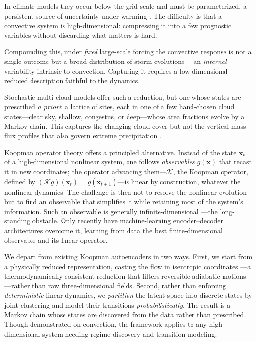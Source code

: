 \documentclass[
    aps,
    prl,
    reprint,
    superscriptaddress,
    amsmath,amssymb,
    floatfix,
    nofootinbib
]{revtex4-2}
\begin{document}
In climate models they occur below the grid scale and must be parameterized, a persistent source of uncertainty under warming \cite{yang2023impact, bolot2025no}. The difficulty is that a convective system is high-dimensional: compressing it into a few prognostic variables without discarding what matters is hard.

Compounding this, under \emph{fixed} large-scale forcing the convective response is not a single outcome but a broad distribution of storm evolutions \cite{abramian2025key, feng2025mesoscale, hu2020observed, fiolleau2024database}---an \emph{internal} variability intrinsic to convection. Capturing it requires a low-dimensional reduced description faithful to the dynamics.

Stochastic multi-cloud models \cite{khouider2006multicloud, majda2008stochastic, khouider2010stochastic} offer such a reduction, but one whose states are prescribed \emph{a priori}: a lattice of sites, each in one of a few hand-chosen cloud states---clear sky, shallow, congestus, or deep---whose area fractions evolve by a Markov chain. This captures the changing cloud cover but not the vertical mass-flux profiles that also govern extreme precipitation \cite{MullerYukari19, singh2012upward, abramian2023extreme, wang2022convective, li2025bimodal}.

Koopman operator theory \cite{koopman1931hamiltonian, brunton2021modern} offers a principled alternative. Instead of the state $\mathbf{x}_t$ of a high-dimensional nonlinear system, one follows \emph{observables} $g(\mathbf{x})$ that recast it in new coordinates; the operator advancing them---$\mathcal{K}$, the Koopman operator, defined by $(\mathcal{K}g)(\mathbf{x}_t) = g(\mathbf{x}_{t+1})$---is linear by construction, whatever the nonlinear dynamics. The challenge is then not to resolve the nonlinear evolution but to find an observable that simplifies it while retaining most of the system's information. Such an observable is generally infinite-dimensional \cite{brunton2021modern}---the long-standing obstacle. Only recently have machine-learning encoder--decoder architectures \cite{lusch2018deep, nathaniel2026generative} overcome it, learning from data the best finite-dimensional observable and its linear operator.

We depart from existing Koopman autoencoders in two ways. First, we start from a physically reduced representation, casting the flow in isentropic coordinates \cite{pauluis2013isentropic}---a thermodynamically consistent reduction that filters reversible adiabatic motions---rather than raw three-dimensional fields. Second, rather than enforcing \emph{deterministic} linear dynamics, we \emph{partition} the latent space into discrete states by joint clustering \cite{kaiser2014cluster, souza2024representing} and model their transitions \emph{probabilistically}. The result is a Markov chain whose states are discovered from the data rather than prescribed. Though demonstrated on convection, the framework applies to any high-dimensional system needing regime discovery and transition modeling.
\end{document}
